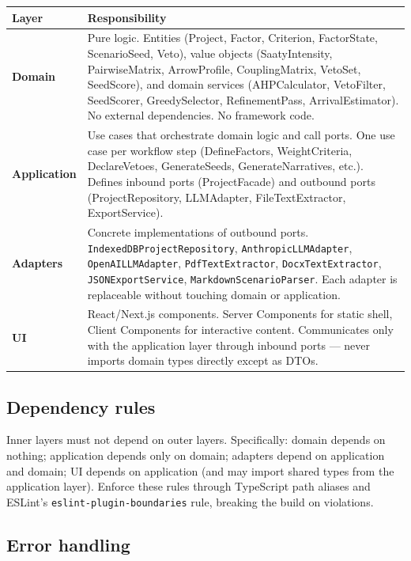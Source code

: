 \documentclass[11pt,a4paper]{article}
\begin{document}
\begin{tabularx}{\textwidth}{lX}
\toprule
\textbf{Layer} & \textbf{Responsibility} \\
\midrule
\textbf{Domain} & Pure logic. Entities (Project, Factor, Criterion, FactorState, ScenarioSeed, Veto), value objects (SaatyIntensity, PairwiseMatrix, ArrowProfile, CouplingMatrix, VetoSet, SeedScore), and domain services (AHPCalculator, VetoFilter, SeedScorer, GreedySelector, RefinementPass, ArrivalEstimator). No external dependencies. No framework code. \\[3pt]
\textbf{Application} & Use cases that orchestrate domain logic and call ports. One use case per workflow step (DefineFactors, WeightCriteria, DeclareVetoes, GenerateSeeds, GenerateNarratives, etc.). Defines inbound ports (ProjectFacade) and outbound ports (ProjectRepository, LLMAdapter, FileTextExtractor, ExportService). \\[3pt]
\textbf{Adapters} & Concrete implementations of outbound ports. \texttt{IndexedDBProjectRepository}, \texttt{AnthropicLLMAdapter}, \texttt{OpenAILLMAdapter}, \texttt{PdfTextExtractor}, \texttt{DocxTextExtractor}, \texttt{JSONExportService}, \texttt{MarkdownScenarioParser}. Each adapter is replaceable without touching domain or application. \\[3pt]
\textbf{UI} & React/Next.js components. Server Components for static shell, Client Components for interactive content. Communicates only with the application layer through inbound ports — never imports domain types directly except as DTOs. \\
\bottomrule
\end{tabularx}

\subsection{Dependency rules}

Inner layers must not depend on outer layers. Specifically: domain depends on nothing; application depends only on domain; adapters depend on application and domain; UI depends on application (and may import shared types from the application layer). Enforce these rules through TypeScript path aliases and ESLint's \texttt{eslint-plugin-boundaries} rule, breaking the build on violations.

\subsection{Error handling}
\end{document}
